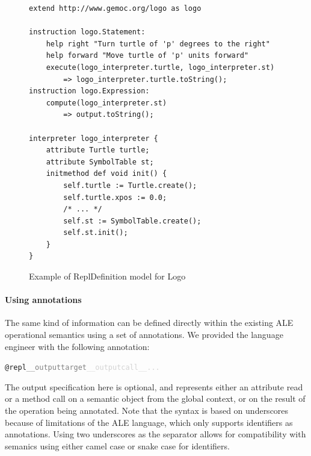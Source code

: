 
\begin{figure}[t]
	\centering
\begin{lstlisting}
extend http://www.gemoc.org/logo as logo

instruction logo.Statement:
    help right "Turn turtle of 'p' degrees to the right" 
    help forward "Move turtle of 'p' units forward" 
    execute(logo_interpreter.turtle, logo_interpreter.st)
        => logo_interpreter.turtle.toString();
instruction logo.Expression:
    compute(logo_interpreter.st)
        => output.toString();

interpreter logo_interpreter {
    attribute Turtle turtle;
    attribute SymbolTable st;
    initmethod def void init() {
        self.turtle := Turtle.create();
        self.turtle.xpos := 0.0;
        /* ... */
        self.st := SymbolTable.create();
        self.st.init();
    }
}

	\end{lstlisting}
	\caption{Example of ReplDefinition model for Logo}
	\label{fig:repltransfo}
\end{figure}

\paragraph{Using annotations}

The same kind of information can be defined directly within the existing ALE operational semantics using a set of annotations.  We provided the language engineer with the following annotation:
\begin{alltt}
    @repl\textcolor{gray}{__outputtarget}\textcolor{lightgray}{__outputcall__...}
\end{alltt}
The output specification here is optional, and represents either an attribute read or a method call on a semantic object from the global context, or on the result of the operation being annotated. Note that the syntax is based on underscores because of limitations of the ALE language, which only supports identifiers as annotations.
Using two underscores as the separator allows for compatibility with semanics using either camel case or snake case for identifiers.


